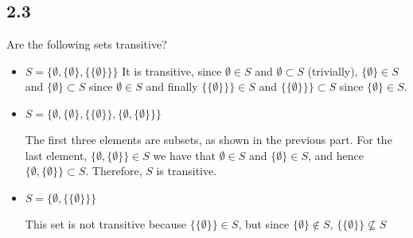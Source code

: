 \subsection*{2.3} Are the following sets transitive?

\begin{itemize}
    \item $S = \{\emptyset, \{\emptyset\}, \{\{\emptyset\}\}\}$
     It is transitive, since $\emptyset \in S$ and $\emptyset \subset S$ (trivially), $\{\emptyset\} \in S$ and $\{\emptyset\} \subset S$ since $\emptyset \in S$ and finally $\{\{\emptyset\}\}\} \in S$ and $\{\{\emptyset\}\}\} \subset S$ since $\{\emptyset\} \in S$.

     \item $S = \{\emptyset, \{\emptyset\}, \{\{\emptyset\}\}, \{\emptyset, \{\emptyset\}\}\}$

     The first three elements are subsets, as shown in the previous part. For the last element, $\{\emptyset, \{\emptyset\}\} \in S$ we have that $\emptyset \in S$ and $\{\emptyset\} \in S$, and hence $\{\emptyset, \{\emptyset\}\} \subset S$. Therefore, $S$ is transitive.

     \item $S = \{\emptyset, \{\{\emptyset\}\}\}$

     This set is not transitive because $\{\{\emptyset\}\} \in S$, but since $\{\emptyset\} \notin S$, $\{\{\emptyset\}\} \nsubseteq S$
\end{itemize}

